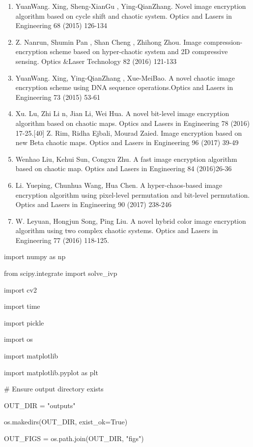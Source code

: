 \begin{enumerate}
\item
  YuanWang. Xing, Sheng-XianGu , Ying-QianZhang. Novel image encryption algorithm based on cycle shift and chaotic system. Optics and Lasers in Engineering 68 (2015) 126-134
\item
  Z. Nanrun, Shumin Pan , Shan Cheng , Zhihong Zhou. Image compression-encryption scheme based on hyper-chaotic system and 2D compressive sensing. Optics \&Laser Technology 82 (2016) 121-133
\item
  YuanWang. Xing, Ying-QianZhang , Xue-MeiBao. A novel chaotic image encryption scheme using DNA sequence operations.Optics and Lasers in Engineering 73 (2015) 53-61
\item
  Xu. Lu, Zhi Li n, Jian Li, Wei Hua. A novel bit-level image encryption algorithm based on chaotic maps. Optics and Lasers in Engineering 78 (2016) 17-25.{[}40{]} Z. Rim, Ridha Ejbali, Mourad Zaied. Image encryption based on new Beta chaotic maps. Optics and Lasers in Engineering 96 (2017) 39-49
\item
  Wenhao Liu, Kehui Sun, Congxu Zhu. A fast image encryption algorithm based on chaotic map. Optics and Lasers in Engineering 84 (2016)26-36
\item
  Li. Yueping, Chunhua Wang, Hua Chen. A hyper-chaos-based image encryption algorithm using pixel-level permutation and bit-level permutation. Optics and Lasers in Engineering 90 (2017) 238-246
\item
  W. Leyuan, Hongjun Song, Ping Liu. A novel hybrid color image encryption algorithm using two complex chaotic systems. Optics and Lasers in Engineering 77 (2016) 118-125.
\end{enumerate}

\textbf{}

\textbf{}

import numpy as np

from scipy.integrate import solve\_ivp

import cv2

import time

import pickle

import os

import matplotlib

import matplotlib.pyplot as plt

\# Ensure output directory exists

OUT\_DIR = "outputs"

os.makedirs(OUT\_DIR, exist\_ok=True)

OUT\_FIGS = os.path.join(OUT\_DIR, "figs")


